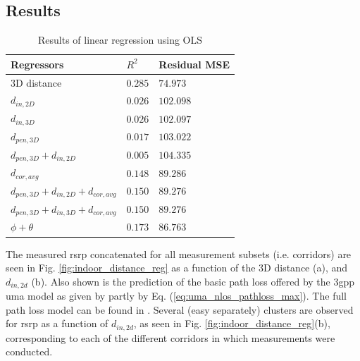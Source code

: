 \subsection{Results}

\begin{table}
    \centering
    \begin{tabular}{@{}l|ll@{}}
    \toprule
    Regressors               & $R^2$ & Residual MSE \\ \midrule
    $3$D distance              & $0.285$ & $74.973$       \\
    $d_{in,2D}$              & $\mathbf{0.026}$ & $\mathbf{102.098}$      \\
    $d_{in,3D}$              & $0.026$ & $102.097$      \\
    $d_{pen,3D}$             & $0.017$ & $103.022$      \\
    $d_{pen,3D} + d_{in,2D}$ & $0.005$ & $104.335$      \\
    $d_{cor,avg}$            & $\mathbf{0.148}$ & $\mathbf{89.286}$       \\
    $d_{pen,3D} + d_{in,2D}+d_{cor,avg}$ & $0.150$ & $89.276$       \\
    $d_{pen,3D} + d_{in,3D}+d_{cor,avg}$ & $0.150$ & $89.276$       \\
    $\phi + \theta$          & $\mathbf{0.173}$ & $\mathbf{86.763}$       \\ \bottomrule
    \end{tabular}
    \caption{Results of linear regression using OLS \cite{seabold2010statsmodels}}\label{tab:ols_results}
    \vspace{1em}
\end{table}
\noindent The measured \gls{rsrp} concatenated for all measurement subsets (i.e. corridors) are seen in Fig. \ref{fig:indoor_distance_reg} as a function of the $3$D distance (a), and $d_{in,2d}$ (b). Also shown is the prediction of the basic path loss offered by the \gls{3gpp} \gls{uma} model as given by partly by Eq. (\ref{eq:uma_nlos_pathloss_max}). The full path loss model can be found in \cite{38211}. Several (easy separately) clusters are observed for \gls{rsrp} as a function of $d_{in,2d}$, as seen in Fig. \ref{fig:indoor_distance_reg}(b), corresponding to each of the different corridors in which measurements were conducted.

